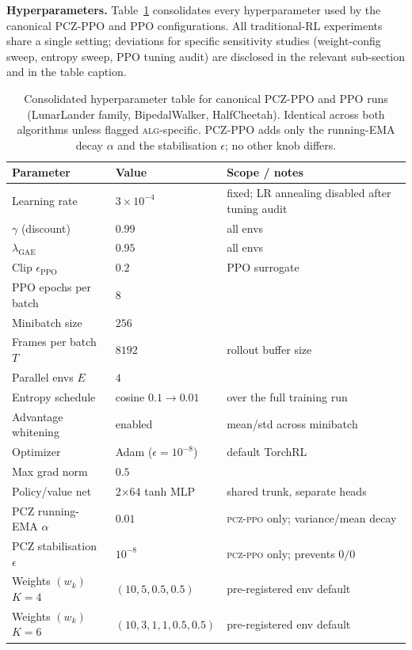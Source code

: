 \documentclass[11pt,a4paper]{article}
\begin{document}
\textbf{Hyperparameters.} Table~\ref{tab:hp} consolidates every hyperparameter used by the canonical PCZ-PPO and PPO configurations. All traditional-RL experiments share a single setting; deviations for specific sensitivity studies (weight-config sweep, entropy sweep, PPO tuning audit) are disclosed in the relevant sub-section and in the table caption.

\begin{table}[H]
\centering
\small
\caption{Consolidated hyperparameter table for canonical PCZ-PPO and PPO runs (LunarLander family, BipedalWalker, HalfCheetah). Identical across both algorithms unless flagged \textsc{alg}-specific. PCZ-PPO adds only the running-EMA decay $\alpha$ and the stabilisation $\epsilon$; no other knob differs.}
\label{tab:hp}
\begin{tabular}{lll}
\toprule
Parameter & Value & Scope / notes \\
\midrule
Learning rate & $3{\times}10^{-4}$ & fixed; LR annealing disabled after tuning audit \\
$\gamma$ (discount) & $0.99$ & all envs \\
$\lambda_{\text{GAE}}$ & $0.95$ & all envs \\
Clip $\epsilon_{\text{PPO}}$ & $0.2$ & PPO surrogate \\
PPO epochs per batch & $8$ & \\
Minibatch size & $256$ & \\
Frames per batch $T$ & $8192$ & rollout buffer size \\
Parallel envs $E$ & $4$ & \\
Entropy schedule & cosine $0.1 \to 0.01$ & over the full training run \\
Advantage whitening & enabled & mean/std across minibatch \\
Optimizer & Adam ($\epsilon{=}10^{-8}$) & default TorchRL \\
Max grad norm & $0.5$ & \\
Policy/value net & 2$\times$64 tanh MLP & shared trunk, separate heads \\
\midrule
PCZ running-EMA $\alpha$ & $0.01$ & \textsc{pcz-ppo} only; variance/mean decay \\
PCZ stabilisation $\epsilon$ & $10^{-8}$ & \textsc{pcz-ppo} only; prevents $0/0$ \\
\midrule
Weights $(w_k)$ $K{=}4$ & $(10,5,0.5,0.5)$ & pre-registered env default \\
Weights $(w_k)$ $K{=}6$ & $(10,3,1,1,0.5,0.5)$ & pre-registered env default \\

\end{tabular}
\end{table}
\end{document}
